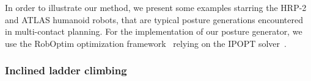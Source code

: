 
In order to illustrate our method, we present some examples starring the HRP-2 and ATLAS humanoid robots, that are typical posture generations encountered in multi-contact planning.
For the implementation of our posture generator, we use the RobOptim optimization framework~\cite{moulard:jsme:2013} relying on the IPOPT solver~\cite{wachter:mathprog:2006}.



\subsubsection{Inclined ladder climbing}
\label{subsubsec:inclined_ladder_climbing}


